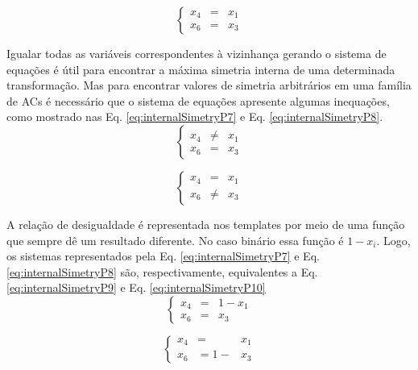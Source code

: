 \begin{equation}
\left\{\begin{matrix}
x_4 & = & x_1\\ 
x_6 & = & x_3
\end{matrix}\right.
\label{eq:internalSimetryP6}
\end{equation}

Igualar todas as variáveis correspondentes à vizinhança gerando o sistema de equações é útil para encontrar a máxima simetria interna de uma determinada transformação. Mas para encontrar valores de simetria arbitrários em uma família de ACs é necessário que o sistema de equações apresente algumas inequações, como mostrado nas Eq. \eqref{eq:internalSimetryP7} e Eq. \eqref{eq:internalSimetryP8}.
\begin{equation}
\left\{\begin{matrix}
x_4 & \neq & x_1\\ 
x_6 & = & x_3
\end{matrix}\right.
\label{eq:internalSimetryP7}
\end{equation}

\begin{equation}
\left\{\begin{matrix}
x_4 & = & x_1\\ 
x_6 & \neq & x_3
\end{matrix}\right.
\label{eq:internalSimetryP8}
\end{equation}

A relação de desigualdade é representada nos templates por meio de uma função que sempre dê um resultado diferente. No caso binário essa função é $1 - x_i$. Logo, os sistemas representados pela Eq. \eqref{eq:internalSimetryP7} e Eq. \eqref{eq:internalSimetryP8} são, respectivamente, equivalentes a Eq. \eqref{eq:internalSimetryP9} e Eq. \eqref{eq:internalSimetryP10}
\begin{equation}
\left\{\begin{matrix}
x_4 & = & 1 - x_1\\ 
x_6 & = & x_3
\end{matrix}\right.
\label{eq:internalSimetryP9}
\end{equation}

\begin{equation}
\left\{\begin{matrix}
x_4 & = & x_1\\ 
x_6 & = 1 - & x_3
\end{matrix}\right.
\label{eq:internalSimetryP10}
\end{equation}

